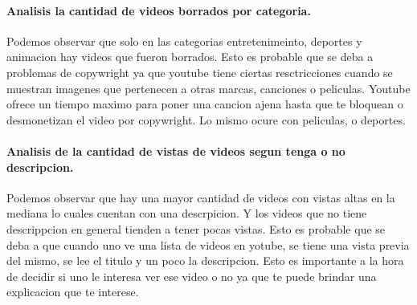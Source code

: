         \paragraph{Analisis la cantidad de videos borrados por categoria.}

            \begin{figure}[ht]
            \end{figure}
        \FloatBarrier
        Podemos observar que solo en las categorias entretenimeinto, deportes y
        animacion hay videos que fueron borrados. Esto es probable que se deba a
        problemas de copywright ya que youtube tiene ciertas resctricciones cuando
        se muestran imagenes que pertenecen a otras marcas, canciones o peliculas.
        Youtube ofrece un tiempo maximo para poner una cancion ajena hasta que te
        bloquean o desmonetizan el video por copywright. Lo mismo ocure con peliculas,
        o deportes.
        \newpage

        \paragraph{Analisis de la cantidad de vistas de videos segun tenga o no descripcion.}

            \begin{figure}[ht]
            \end{figure}
        \FloatBarrier
        Podemos observar que hay una mayor cantidad de videos con vistas altas
        en la mediana lo cuales cuentan con una descrpicion. Y los videos que
        no tiene descrippcion en general tienden a tener pocas vistas. Esto es
        probable que se deba a que cuando uno ve una lista de videos en yotube,
        se tiene una vista previa del mismo, se lee el titulo y un poco la
        descripcion. Esto es importante a la hora de decidir si uno le interesa
        ver ese video o no ya que te puede brindar una explicacion que te
        interese.
        \newpage

